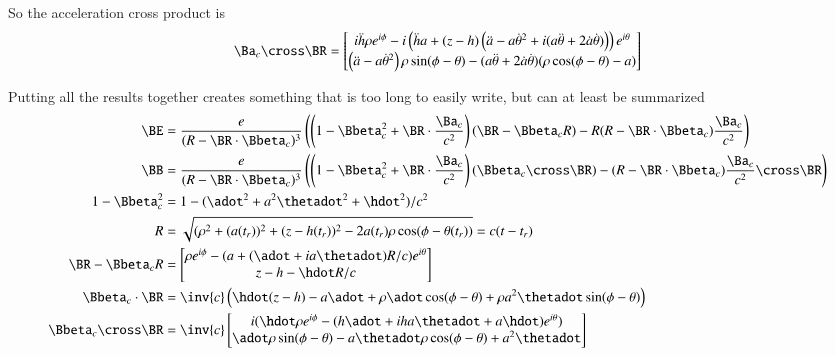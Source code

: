 {So the acceleration cross product is
%
\begin{equation}\label{eqn:relativisticElectrodynamicsExamReflection:980}
\Ba_c \cross \BR
=
\begin{bmatrix}
i \ddot{h} \rho e^{i\phi}
- i \left( \ddot{h} a + (z - h) \left( \ddot{a} - a {\dot{\theta}}^2 + i ( a\ddot{\theta} + 2 \dot{a} \dot{\theta} ) \right) \right) e^{i\theta} \\
\left( \ddot{a} - a {\dot{\theta}}^2 \right) \rho \sin(\phi - \theta)
-( a\ddot{\theta} + 2 \dot{a} \dot{\theta} ) (\rho \cos(\phi -\theta) - a)
\end{bmatrix}
\end{equation}

Putting all the results together creates something that is too long to easily write, but can at least be summarized
%
\begin{equation}\label{eqn:relativisticElectrodynamicsExamReflection:990}
\begin{aligned}
\BE
&=
\frac{e}{(R - \BR \cdot \Bbeta_c)^3}\left(
\left(1 - \Bbeta_c^2 + \BR \cdot \frac{\Ba_c}{c^2}
\right) (\BR - \Bbeta_c R)
- R(R - \BR \cdot \Bbeta_c) \frac{\Ba_c}{c^2}
\right) \\
\BB
&=
\frac{e}{(R - \BR \cdot \Bbeta_c)^3}\left(
\left(1 - \Bbeta_c^2 + \BR \cdot \frac{\Ba_c}{c^2}
\right) (\Bbeta_c \cross \BR)
- (R - \BR \cdot \Bbeta_c) \frac{\Ba_c}{c^2} \cross \BR
\right) \\
1 - \Bbeta_c^2 &= 1 - (\adot^2 + a^2 \thetadot^2 + \hdot^2)/c^2 \\
R &= \sqrt{(\rho^2 + (a(t_r))^2 + (z-h(t_r))^2 - 2 a(t_r) \rho \cos(\phi - \theta(t_r))} = c( t - t_r) \\
\BR - \Bbeta_c R &=
\begin{bmatrix}
\rho e^{i\phi} - (a + (\adot + i a\thetadot) R/c) e^{i\theta} \\
z - h - \hdot R/c
\end{bmatrix} \\
\Bbeta_c \cdot \BR &= \inv{c}\left( \hdot (z - h) -a \adot + \rho \adot \cos(\phi- \theta) + \rho a^2 \thetadot \sin(\phi - \theta) \right) \\
\Bbeta_c \cross \BR
&=
\inv{c}
\begin{bmatrix}
i( \hdot \rho e^{i\phi} - (h \adot + i h a \thetadot + a \hdot) e^{i\theta} ) \\
\adot \rho \sin(\phi - \theta) - a \thetadot \rho \cos(\phi - \theta) + a^2 \thetadot
\end{bmatrix} \\

\end{aligned}
\end{equation}}
